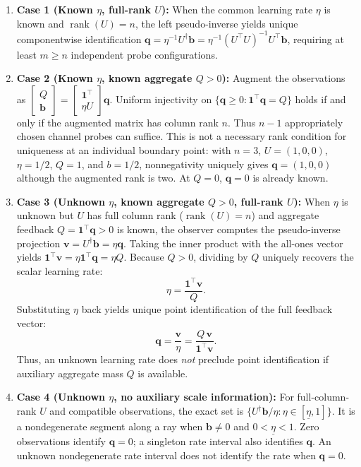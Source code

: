 \documentclass[10pt,twocolumn,letterpaper]{article}
\theoremstyle{definition}
\theoremstyle{remark}
\begin{document}
\begin{enumerate}
    \item \textbf{Case 1 (Known $\eta$, full-rank $U$):} When the common learning rate $\eta$ is known and $\operatorname{rank}(U) = n$, the left pseudo-inverse yields unique componentwise identification $\mathbf{q} = \eta^{-1} U^\dagger \mathbf{b} = \eta^{-1} (U^\top U)^{-1} U^\top \mathbf{b}$, requiring at least $m \ge n$ independent probe configurations.
    \item \textbf{Case 2 (Known $\eta$, known aggregate $Q>0$):} Augment the observations as $\begin{bmatrix} Q \\ \mathbf{b} \end{bmatrix}=\begin{bmatrix}\mathbf1^\top\\\eta U\end{bmatrix}\mathbf q$. Uniform injectivity on $\{\mathbf q\ge0:\mathbf1^\top\mathbf q=Q\}$ holds if and only if the augmented matrix has column rank $n$. Thus $n-1$ appropriately chosen channel probes can suffice. This is not a necessary rank condition for uniqueness at an individual boundary point: with $n=3$, $U=(1,0,0)$, $\eta=1/2$, $Q=1$, and $b=1/2$, nonnegativity uniquely gives $\mathbf q=(1,0,0)$ although the augmented rank is two. At $Q=0$, $\mathbf q=0$ is already known.
    \item \textbf{Case 3 (Unknown $\eta$, known aggregate $Q > 0$, full-rank $U$):} When $\eta$ is unknown but $U$ has full column rank ($\operatorname{rank}(U) = n$) and aggregate feedback $Q = \mathbf{1}^\top \mathbf{q} > 0$ is known, the observer computes the pseudo-inverse projection $\mathbf{v} = U^\dagger \mathbf{b} = \eta \mathbf{q}$. Taking the inner product with the all-ones vector yields $\mathbf{1}^\top \mathbf{v} = \eta \mathbf{1}^\top \mathbf{q} = \eta Q$. Because $Q > 0$, dividing by $Q$ uniquely recovers the scalar learning rate:
    \begin{equation}
     \eta = \frac{\mathbf{1}^\top \mathbf{v}}{Q}.
    \end{equation}
    Substituting $\eta$ back yields unique point identification of the full feedback vector:
    \begin{equation}
     \mathbf{q} = \frac{\mathbf{v}}{\eta} = \frac{Q\,\mathbf{v}}{\mathbf{1}^\top \mathbf{v}}.
    \end{equation}
    Thus, an unknown learning rate does \emph{not} preclude point identification if auxiliary aggregate mass $Q$ is available.
    \item \textbf{Case 4 (Unknown $\eta$, no auxiliary scale information):} For full-column-rank $U$ and compatible observations, the exact set is $\{U^\dagger\mathbf b/\eta:\eta\in[\underline\eta,1]\}$. It is a nondegenerate segment along a ray when $\mathbf b\ne0$ and $0<\underline\eta<1$. Zero observations identify $\mathbf q=0$; a singleton rate interval also identifies $\mathbf q$. An unknown nondegenerate rate interval does not identify the rate when $\mathbf q=0$.

\end{enumerate}
\end{document}
